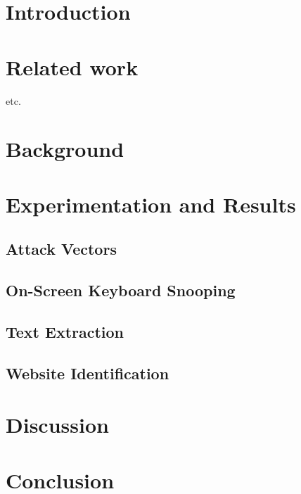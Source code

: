 \documentclass[11pt]{report} %
\begin{document}
    \newenvironment{mainf}{}{}
    \titlespacing*{\chapter}{0pt}{-29 pt}{6 pt} %
    \begin{mainf}
    
    \newpage
    \pagestyle{plain} %
    
    \setlength{\parskip}{10 pt} %
    \setlength{\parindent}{0pt}
    
    \chapter{Introduction}
    \chapter{Related work}  etc.
    \chapter{Background}
    \chapter{Experimentation and Results}
        \section{Attack Vectors}
        \section{On-Screen Keyboard Snooping}
        \section{Text Extraction}
        \section{Website Identification}
    \chapter{Discussion}
    \chapter{Conclusion}
    \end{mainf}
    
\end{document}
